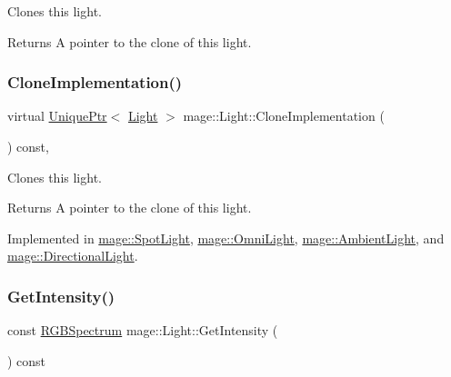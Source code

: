 Clones this light.

\begin{DoxyReturn}{Returns}
A pointer to the clone of this light. 
\end{DoxyReturn}
\hypertarget{classmage_1_1_light_aa613d76a1ebda69efde853d15f75490c}{}\label{classmage_1_1_light_aa613d76a1ebda69efde853d15f75490c} 
\subsubsection{\texorpdfstring{Clone\+Implementation()}{CloneImplementation()}}
{\footnotesize\ttfamily virtual \hyperlink{namespacemage_a8c307fbcc33bce9b7f2aa4c26c3b95cf}{Unique\+Ptr}$<$ \hyperlink{classmage_1_1_light}{Light} $>$ mage\+::\+Light\+::\+Clone\+Implementation (\begin{DoxyParamCaption}{ }\end{DoxyParamCaption}) const\hspace{0.3cm}{\ttfamily [private]}, {}}

Clones this light.

\begin{DoxyReturn}{Returns}
A pointer to the clone of this light. 
\end{DoxyReturn}


Implemented in \hyperlink{classmage_1_1_spot_light_a060044ae1de97143878ad26524f03709}{mage\+::\+Spot\+Light}, \hyperlink{classmage_1_1_omni_light_a1212457828cdd96cc7170767b7bd1223}{mage\+::\+Omni\+Light}, \hyperlink{classmage_1_1_ambient_light_a7223a4770653c20e662810b0956c6e51}{mage\+::\+Ambient\+Light}, and \hyperlink{classmage_1_1_directional_light_a122d3dcd7633a85ef8a85e7d768da36d}{mage\+::\+Directional\+Light}.

\hypertarget{classmage_1_1_light_ad4ffb4c5fa06812e7d523a69b177d55a}{}\label{classmage_1_1_light_ad4ffb4c5fa06812e7d523a69b177d55a} 
\subsubsection{\texorpdfstring{Get\+Intensity()}{GetIntensity()}}
{\footnotesize\ttfamily const \hyperlink{structmage_1_1_r_g_b_spectrum}{R\+G\+B\+Spectrum} mage\+::\+Light\+::\+Get\+Intensity (\begin{DoxyParamCaption}{ }\end{DoxyParamCaption}) const\hspace{0.3cm}{\ttfamily [noexcept]}}

